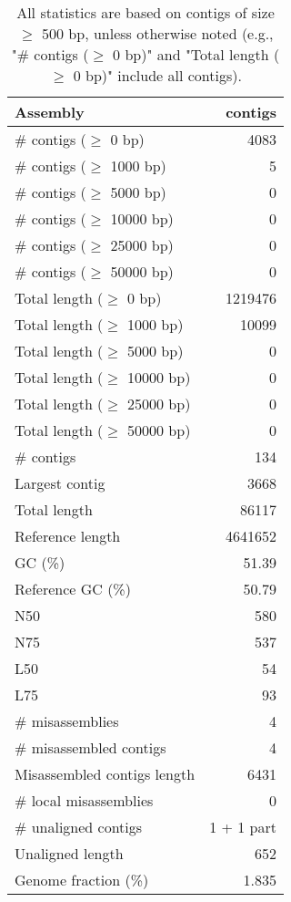 \documentclass[12pt,a4paper]{article}
\begin{document}
\begin{table}[ht]
\begin{center}
\caption{All statistics are based on contigs of size $\geq$ 500 bp, unless otherwise noted (e.g., "\# contigs ($\geq$ 0 bp)" and "Total length ($\geq$ 0 bp)" include all contigs).}
\begin{tabular}{|l*{1}{|r}|}
\hline
Assembly & contigs \\ \hline
\# contigs ($\geq$ 0 bp) & 4083 \\ \hline
\# contigs ($\geq$ 1000 bp) & 5 \\ \hline
\# contigs ($\geq$ 5000 bp) & 0 \\ \hline
\# contigs ($\geq$ 10000 bp) & 0 \\ \hline
\# contigs ($\geq$ 25000 bp) & 0 \\ \hline
\# contigs ($\geq$ 50000 bp) & 0 \\ \hline
Total length ($\geq$ 0 bp) & 1219476 \\ \hline
Total length ($\geq$ 1000 bp) & 10099 \\ \hline
Total length ($\geq$ 5000 bp) & 0 \\ \hline
Total length ($\geq$ 10000 bp) & 0 \\ \hline
Total length ($\geq$ 25000 bp) & 0 \\ \hline
Total length ($\geq$ 50000 bp) & 0 \\ \hline
\# contigs & 134 \\ \hline
Largest contig & 3668 \\ \hline
Total length & 86117 \\ \hline
Reference length & 4641652 \\ \hline
GC (\%) & 51.39 \\ \hline
Reference GC (\%) & 50.79 \\ \hline
N50 & 580 \\ \hline
N75 & 537 \\ \hline
L50 & 54 \\ \hline
L75 & 93 \\ \hline
\# misassemblies & 4 \\ \hline
\# misassembled contigs & 4 \\ \hline
Misassembled contigs length & 6431 \\ \hline
\# local misassemblies & 0 \\ \hline
\# unaligned contigs & 1 + 1 part \\ \hline
Unaligned length & 652 \\ \hline
Genome fraction (\%) & 1.835 \\ \hline

\end{tabular}
\end{center}
\end{table}
\end{document}
